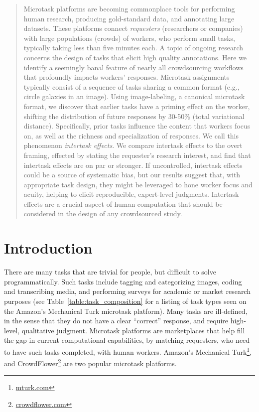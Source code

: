 \documentclass{sigchi}
\begin{document}
\begin{abstract}
Microtask platforms are becoming commonplace tools for performing human
research, producing gold-standard data, and annotating large datasets.
These platforms connect \textit{requesters}
(researchers or companies) with large populations (crowds) of workers, who 
perform small tasks, typically taking less than five minutes each.
A topic of ongoing research concerns the design of tasks that elicit high
quality annotations.
Here we identify a seemingly banal feature of nearly all crowdsourcing 
workflows that profoundly impacts workers' responses.
Microtask assignments typically consist of a sequence 
of tasks sharing a common format (e.g., circle galaxies in an image). 
Using image-labeling, a canonical microtask format, we 
discover that earlier tasks have a priming effect on the worker, shifting 
the distribution of future responses by 30-50\% 
(total variational distance). 
Specifically, prior tasks influence the content that workers focus on, 
as well as the richness and specialization of responses. 
We call this phenomenon \textit{intertask effects}.
We compare intertask effects to the overt framing, 
effected by stating the requester's research interest, 
and find that intertask effects are on par or stronger.
If uncontrolled, intertask effects could be a source of systematic bias, 
but our results suggest that, with appropriate task design, 
they might be leveraged to hone worker focus and acuity, 
helping to elicit reproducible, expert-level judgments.
Intertask effects are a crucial aspect of human computation that should be
considered in the design of any crowdsourced study.
\end{abstract}



\section{Introduction}
There are many tasks that are trivial for people, but difficult to solve
programmatically.  
Such tasks include tagging and categorizing images,
coding and transcribing media,
and performing surveys for 
academic or market research purposes (see Table~\ref{table:task_composition} for a listing of task types seen on the Amazon's Mechanical Turk 
microtask platform).
Many tasks are ill-defined, in the sense that they do not have
a clear ``correct'' response, and require high-level, qualitative judgment.
Microtask platforms are marketplaces that help fill the gap in current 
computational capabilities, by matching requesters, who need to have such 
tasks completed, with human workers.  Amazon's Mechanical Turk\footnote{\url{mturk.com}}, and 
CrowdFlower\footnote{\url{crowdflower.com}} are two popular microtask 
platforms.  
\end{document}
